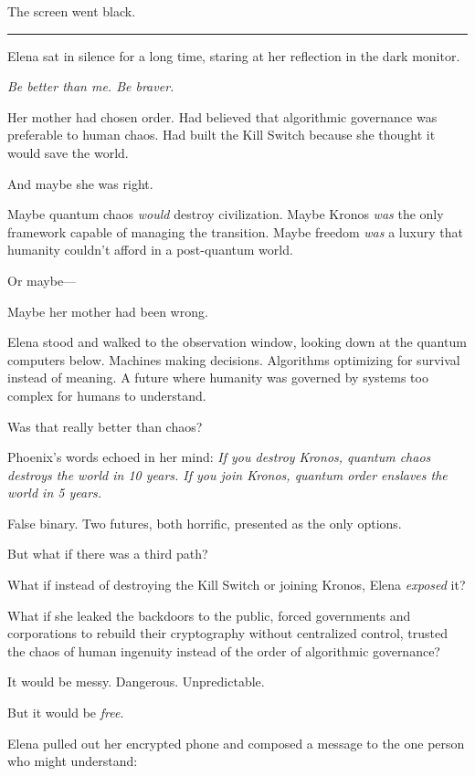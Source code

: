 The screen went black.

\begin{center}\rule{0.5\linewidth}{0.5pt}\end{center}

Elena sat in silence for a long time, staring at her reflection in the dark monitor.

\emph{Be better than me. Be braver.}

Her mother had chosen order. Had believed that algorithmic governance was preferable to human chaos. Had built the Kill Switch because she thought it would save the world.

And maybe she was right.

Maybe quantum chaos \emph{would} destroy civilization. Maybe Kronos \emph{was} the only framework capable of managing the transition. Maybe freedom \emph{was} a luxury that humanity couldn't afford in a post-quantum world.

Or maybe---

Maybe her mother had been wrong.

Elena stood and walked to the observation window, looking down at the quantum computers below. Machines making decisions. Algorithms optimizing for survival instead of meaning. A future where humanity was governed by systems too complex for humans to understand.

Was that really better than chaos?

Phoenix's words echoed in her mind: \emph{If you destroy Kronos, quantum chaos destroys the world in 10 years. If you join Kronos, quantum order enslaves the world in 5 years.}

False binary. Two futures, both horrific, presented as the only options.

But what if there was a third path?

What if instead of destroying the Kill Switch or joining Kronos, Elena \emph{exposed} it?

What if she leaked the backdoors to the public, forced governments and corporations to rebuild their cryptography without centralized control, trusted the chaos of human ingenuity instead of the order of algorithmic governance?

It would be messy. Dangerous. Unpredictable.

But it would be \emph{free}.

Elena pulled out her encrypted phone and composed a message to the one person who might understand:

